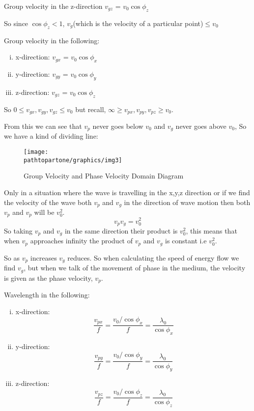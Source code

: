 \begin{center}
Group velocity in the z-direction
$v_{gz}$ = $v_0\cos\phi_{z}$
\end{center}
So since $\cos\phi_{z} < 1$, $v_g$(which is the velocity of a particular point)$\leq v_0$

Group velocity in the following:
\begin{enumerate}[(i)]
\item x-direction:	$v_{gx}$ = $v_0\cos\phi_{x}$
\item y-direction: 	$v_{gy}$ = $v_0\cos\phi_{y}$
\item z-direction:	$v_{gz}$ = $v_0\cos\phi_{z}$
\end{enumerate}

So $0\leq v_{gx},v_{gy},v_{gz} \leq v_0$ but recall, $\infty\geq v_{px},v_{py},v_{pz} \geq v_0$.

From this we can see that $v_p$ never goes below $v_0$ and $v_g$ never goes above $v_0$,
So we have a kind of dividing line:
\begin{figure}[h]
\centering
\texttt{[image: \\pathtopartone/graphics/img3]}
\caption{Group Velocity and Phase Velocity Domain Diagram}
\end{figure}

Only in a situation where the wave is travelling in the x,y,z direction or if we find the velocity of the wave both $v_p$ and $v_g$ in the direction of wave motion then both $v_p$ and $v_p$ will be $v_{0}^2$.
\begin{equation}
v_p v_g = v_{0}^2
\end{equation}
So taking $v_p$ and $v_g$ in the same direction their product is $v_{0}^2$, this means that when $v_p$ approaches infinity the product of $v_p$ and $v_g$ is constant i.e $v_{0}^2$.

So as $v_p$ increases $v_g$ reduces. So when calculating the speed of energy flow we find $v_g$, but when we talk of the movement of phase in the medium, the velocity is given as the phase velocity,  $v_p$.

Wavelength in the following:
\begin{enumerate}[(i)]
\item x-direction: 
\begin{dmath*}	
\frac{v_{px}}{f} = \frac{v_0/\cos\phi_{x}}{f}
= \frac{\lambda_0}{\cos\phi_{x}}
\end{dmath*}
\item y-direction: 	
\begin{dmath*}
\frac{v_{py}}{f} = \frac{v_0/\cos\phi_{y}}{f}
= \frac{\lambda_0}{\cos\phi_{y}}
\end{dmath*}
\item z-direction: 	
\begin{dmath*}
\frac{v_{pz}}{f} = \frac{v_0/\cos\phi_{z}}{f}
= \frac{\lambda_0}{\cos\phi_{z}}
\end{dmath*}
\end{enumerate}


